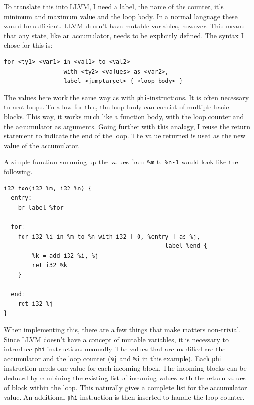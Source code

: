 \documentclass[a4paper,bibliography=totocnumbered,parskip,headsepline]{scrbook}
\begin{document}
To translate this into LLVM, I need a label, the name of the counter, it's minimum and maximum value and the loop body.
In a normal language these would be sufficient.
LLVM doesn't have mutable variables, however.
This means that any state, like an accumulator, needs to be explicitly defined.
The syntax I chose for this is:

\begin{lstlisting}[numbers=none]
for <ty1> <var1> in <val1> to <val2>
                 with <ty2> <values> as <var2>,
                 label <jumptarget> { <loop body> }
\end{lstlisting}

The values here work the same way as with \lstinline!phi!-instructions.
It is often necessary to nest loops.
To allow for this, the loop body can consist of multiple basic blocks.
This way, it works much like a function body, with the loop counter and the accumulator as arguments.
Going further with this analogy, I reuse the return statement to indicate the end of the loop.
The value returned is used as the new value of the accumulator.

A simple function summing up the values from \lstinline{%m} to \lstinline{%n-1} would look like the following.
\begin{lstlisting}
i32 foo(i32 %m, i32 %n) {
  entry:
    br label %for

  for:
    for i32 %i in %m to %n with i32 [ 0, %entry ] as %j,
                                              label %end {
        %k = add i32 %i, %j
        ret i32 %k
    }

  end:
    ret i32 %j
}
\end{lstlisting}

When implementing this, there are a few things that make matters non-trivial.
Since LLVM doesn't have a concept of mutable variables, it is necessary to introduce \lstinline{phi} instructions manually.
The values that are modified are the accumulator and the loop counter (\lstinline!%j! and \lstinline!%i! in this example).
Each \lstinline{phi} instruction needs one value for each incoming block.
The incoming blocks can be deduced by combining the existing list of incoming values with the return values of block within the loop.
This naturally gives a complete list for the accumulator value.
An additional \lstinline{phi} instruction is then inserted to handle the loop counter.
\end{document}
